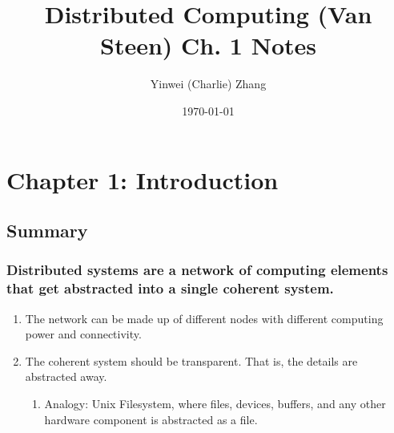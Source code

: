 \documentclass[11pt]{article}
\author{Yinwei (Charlie) Zhang}
\date{\today}
\title{Distributed Computing (Van Steen) Ch. 1 Notes}
\begin{document}
\maketitle
\tableofcontents

\section{Chapter 1: Introduction}
\label{sec-1}
\subsection{Summary}
\label{sec-1-1}
\subsubsection{Distributed systems are a network of computing elements that get abstracted into a single coherent system.}
\label{sec-1-1-1}
\begin{enumerate}
\item The network can be made up of different nodes with different computing power and connectivity.
\label{sec-1-1-1-1}
\item The coherent system should be transparent.  That is, the details are abstracted away.
\label{sec-1-1-1-2}
\begin{enumerate}
\item Analogy: Unix Filesystem, where files, devices, buffers, and any other hardware component is abstracted as a file.
\label{sec-1-1-1-2-1}
\end{enumerate}
\end{enumerate}
\end{document}
